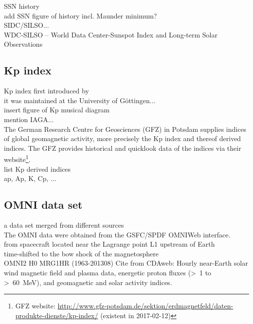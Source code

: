 SSN history\\
add SSN figure of history incl. Maunder minimum?\\

SIDC/SILSO...\\
WDC-SILSO -- World Data Center-Sunspot Index and Long-term Solar Observations\\


\subsection{Kp index}
\label{sec:kp_index}

Kp index first introduced by \citet{Bartels1949}\\
it was maintained at the University of Göttingen...\\

insert figure of Kp musical diagram\\

mention IAGA...\\

The German Research Centre for Geosciences (GFZ) in Potsdam supplies indices of global geomagnetic activity, more precisely the Kp index and thereof derived indices. The GFZ provides historical and quicklook data of the indices via their website\footnote{GFZ website: \url{http://www.gfz-potsdam.de/sektion/erdmagnetfeld/daten-produkte-dienste/kp-index/} (existent in 2017-02-12)}.\\
list Kp derived indices\\
ap, Ap, K, Cp, ...\\


\subsection{OMNI data set}
\label{sec:omni_data_set}

a data set merged from different sources\\
The OMNI data \citep{King2005} were obtained from the GSFC/SPDF OMNIWeb interface.\\

from spacecraft located near the Lagrange point L1 upstream of Earth\\
time-shifted to the bow shock of the magnetosphere\\

OMNI2 H0 MRG1HR (1963-201308)
Cite from CDAweb: Hourly near-Earth solar wind magnetic field and plasma data, energetic proton fluxes (>~1 to >~60~MeV), and geomagnetic and solar activity indices.


